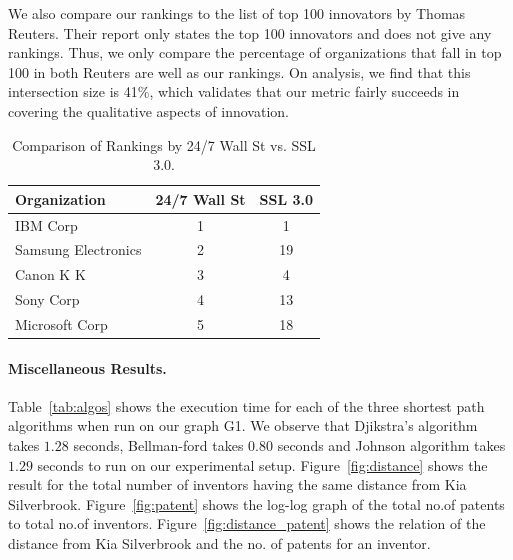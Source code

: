 We also compare our rankings to the list of top 100 innovators by Thomas
Reuters. Their report only states the top 100 innovators and does not give any
rankings. Thus, we only compare the percentage of organizations that fall in
top 100 in both Reuters are well as our rankings. On analysis, we find that
this intersection size is 41\%, which validates that our metric fairly
succeeds in covering the qualitative aspects of innovation.

\begin{table}[t]
\centering
\begin{tabular}{|l|c|c|}
\hline
\textbf{Organization}        & \multicolumn{1}{l|}{\textbf{24/7 Wall St}} & \multicolumn{1}{l|}{\textbf{SSL 3.0}} \\ \hline
IBM Corp                     & 1                                          & 1                                         \\ \hline
Samsung Electronics          & 2                                          & 19                                        \\ \hline
Canon K K                    & 3                                          & 4                                         \\ \hline
Sony Corp                    & 4                                          & 13                                        \\ \hline
Microsoft Corp               & 5                                          & 18                                        \\ \hline
\end{tabular}
\caption{Comparison of Rankings by 24/7 Wall St vs. SSL 3.0.}
\label{tab:validation}
\end{table}


\paragraph{Miscellaneous Results.}
Table~\ref{tab:algos} shows the execution time for each of the three shortest
path algorithms  when run on our graph G1. We observe that Djikstra's
algorithm takes $1.28$ seconds, Bellman-ford takes $0.80$ seconds and Johnson
algorithm takes $1.29$ seconds to run on our experimental setup.
Figure~\ref{fig:distance} shows the result for the total number of inventors
having the same distance from Kia Silverbrook. Figure~\ref{fig:patent} shows the log-log graph of the total
no.of patents to total no.of inventors. 
Figure~\ref{fig:distance_patent} shows the relation of the distance from
Kia Silverbrook and the no. of patents for an inventor. 




